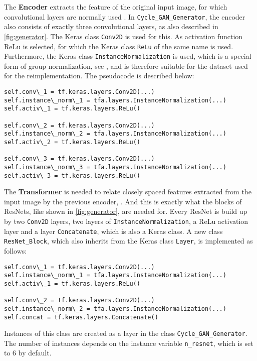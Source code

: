 \documentclass[fleqn,10pt]{SelfArx} %
\begin{document}
The \textbf{Encoder} extracts the feature of the original input image, for which convolutional layers are normally used \cite{Introduction-to-Cycle-GANs}. In \texttt{Cycle\_GAN\_Generator}, the encoder also consists of exactly three convolutional layers, as also described in \autoref{fig:generator}. The Keras class \texttt{Conv2D} is used for this. As activation function \ac{ReLu} is selected, for which the Keras class \texttt{ReLu} of the same name is used. Furthermore, the Keras class \texttt{InstanceNormalization} is used, which is a special form of group normalization, see \cite{google-tf-InstanceNormalization}, and is therefore suitable for the dataset used for the reimplementation. The pseudocode is described below:
\begin{lstlisting}
self.conv\_1 = tf.keras.layers.Conv2D(...)
self.instance\_norm\_1 = tfa.layers.InstanceNormalization(...)
self.activ\_1 = tf.keras.layers.ReLu()

self.conv\_2 = tf.keras.layers.Conv2D(...)
self.instance\_norm\_2 = tfa.layers.InstanceNormalization(...)
self.activ\_2 = tf.keras.layers.ReLu()

self.conv\_3 = tf.keras.layers.Conv2D(...)
self.instance\_norm\_3 = tfa.layers.InstanceNormalization(...)
self.activ\_3 = tf.keras.layers.ReLu()
\end{lstlisting}

The \textbf{Transformer} is needed to relate closely spaced features extracted from the input image by the previous encoder, \cite{Introduction-to-Cycle-GANs}. And this is exactly what the blocks of \acp{ResNet}, like shown in \autoref{fig:generator}, are needed for. Every \ac{ResNet} is build up by two \texttt{Conv2D} layers, two layers of \texttt{InstanceNormalization}, a \ac{ReLu} activation layer and a layer \texttt{Concatenate}, which is also a Keras class. A new class \texttt{ResNet\_Block}, which also inherits from the Keras class \texttt{Layer}, is implemented as follows:
\begin{lstlisting}
self.conv\_1 = tf.keras.layers.Conv2D(...)
self.instance\_norm\_1 = tfa.layers.InstanceNormalization(...)
self.activ\_1 = tf.keras.layers.ReLu()

self.conv\_2 = tf.keras.layers.Conv2D(...)
self.instance\_norm\_2 = tfa.layers.InstanceNormalization(...)
self.concat = tf.keras.layers.Concatenate()
\end{lstlisting}

Instances of this class are created as a layer in the class \texttt{Cycle\_GAN\_Generator}. The number of instances depends on the instance variable \texttt{n\_resnet}, which is set to 6 by default.
\end{document}
